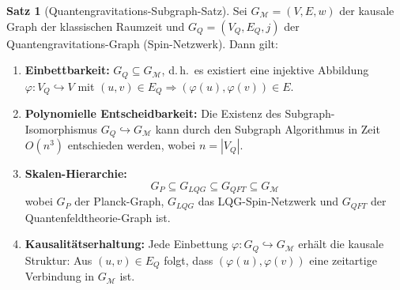 ﻿\documentclass[a4paper,12pt]{article}
\theoremstyle{definition}
\newtheorem{satz}{Satz}
\begin{document}
\begin{satz}[Quantengravitations-Subgraph-Satz]
\label{satz:qg_subgraph}
	Sei $G_{\mathcal{M}} = (V, E, w)$ der kausale Graph der klassischen
	Raumzeit und $G_Q = (V_Q, E_Q, j)$ der Quantengravitations-Graph
	(Spin-Netzwerk). Dann gilt:

	\begin{enumerate}
		\item \textbf{Einbettbarkeit:} $G_Q \subseteq G_{\mathcal{M}}$,
		      d.\,h.\ es existiert eine injektive Abbildung
		      $\varphi: V_Q \hookrightarrow V$ mit
		      $(u,v) \in E_Q \Rightarrow (\varphi(u), \varphi(v)) \in E$.

		\item \textbf{Polynomielle Entscheidbarkeit:} Die Existenz des
		      Subgraph-Isomorphismus $G_Q \hookrightarrow G_{\mathcal{M}}$
		      kann durch den Subgraph Algorithmus in Zeit $O(n^3)$ entschieden
		      werden, wobei $n = |V_Q|$.

		\item \textbf{Skalen-Hierarchie:}
		      \[
		      G_P \subseteq G_{LQG} \subseteq G_{QFT} \subseteq G_{\mathcal{M}}
		      \]
		      wobei $G_P$ der Planck-Graph, $G_{LQG}$ das LQG-Spin-Netzwerk
		      und $G_{QFT}$ der Quantenfeldtheorie-Graph ist.

		\item \textbf{Kausalit\"atserhaltung:} Jede Einbettung
		      $\varphi: G_Q \hookrightarrow G_{\mathcal{M}}$ erh\"alt die
		      kausale Struktur: Aus $(u,v) \in E_Q$ folgt, dass
		      $(\varphi(u), \varphi(v))$ eine zeitartige Verbindung in
		      $G_{\mathcal{M}}$ ist.
	\end{enumerate}
\end{satz}
\end{document}
